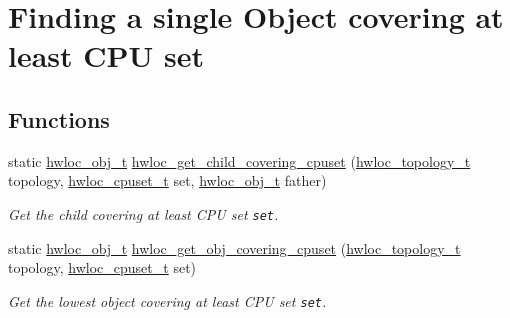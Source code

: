 \hypertarget{group__hwlocality__helper__find__covering}{
\section{Finding a single Object covering at least CPU set}
\label{group__hwlocality__helper__find__covering}
}
\subsection*{Functions}
\begin{CompactItemize}
\item 
static \hyperlink{structhwloc__obj}{hwloc\_\-obj\_\-t} \hyperlink{group__hwlocality__helper__find__covering_ge5124e202a86121b45c28ac6d67b5e5b}{hwloc\_\-get\_\-child\_\-covering\_\-cpuset} (\hyperlink{group__hwlocality__topology_g9d1e76ee15a7dee158b786c30b6a6e38}{hwloc\_\-topology\_\-t} topology, \hyperlink{group__hwlocality__cpuset_g82e51d695c430832b703dad5ab8d75e4}{hwloc\_\-cpuset\_\-t} set, \hyperlink{structhwloc__obj}{hwloc\_\-obj\_\-t} father)
\begin{CompactList}\small\item\em Get the child covering at least CPU set {\tt set}. \item\end{CompactList}\item 
static \hyperlink{structhwloc__obj}{hwloc\_\-obj\_\-t} \hyperlink{group__hwlocality__helper__find__covering_gbbbc2201adff148989b2faf532de3a5f}{hwloc\_\-get\_\-obj\_\-covering\_\-cpuset} (\hyperlink{group__hwlocality__topology_g9d1e76ee15a7dee158b786c30b6a6e38}{hwloc\_\-topology\_\-t} topology, \hyperlink{group__hwlocality__cpuset_g82e51d695c430832b703dad5ab8d75e4}{hwloc\_\-cpuset\_\-t} set)
\begin{CompactList}\small\item\em Get the lowest object covering at least CPU set {\tt set}. \item\end{CompactList}\end{CompactItemize}


